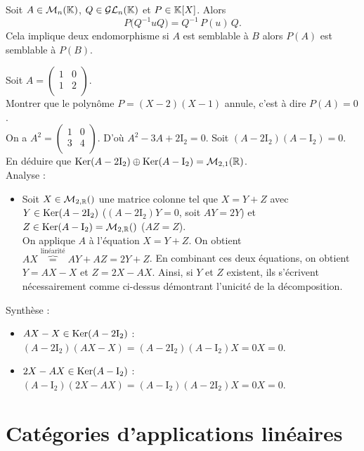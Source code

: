 \documentclass{book}
\begin{document}
\begin{Proposition}[Conjugaison]
Soit $A\in  \mathcal{M}_{n}(\mathbb{K})$, $Q\in  \mathcal{GL}_n(\mathbb{K})$ et $P\in  \mathbb{K} [X]$.
Alors
\[ P \bigl( Q^{-1}u Q \bigr) = Q^{-1} \, P(u) \, Q. \]
Cela implique deux endomorphisme si $A$ est semblable à $B$ alors $P(A)$ est semblable à $P(B)$.
\end{Proposition}
\begin{Exemple}
Soit $A=\begin{pmatrix}
1 &0 \\ 1&2\\
\end{pmatrix}$.\\
Montrer que le polynôme $P=(X-2)(X-1)$ annule, c'est à dire $P(A)=0$.\\
On a $A^2=\begin{pmatrix}
1 &0 \\ 3&4\\
\end{pmatrix}$. D'où $A^2-3A+2\mathrm{I}_2=0$. Soit  $(A-2\mathrm{I}_2)(A-\mathrm{I}_2)=0.$
En déduire que $\operatorname{Ker}(A-2\mathrm{I}_2)\oplus \operatorname{Ker}(A-\mathrm{I}_2)=\mathcal{M}_{2,1}(\mathbb{R})$.\\
Analyse :
\begin{itemize}
\item  Soit $X\in \M{2}{\R}$ une matrice colonne tel que $X=Y+Z$ avec  $Y\in \operatorname{Ker}(A-2\mathrm{I}_2)$ ($(A-2\mathrm{I}_2)Y=0$, soit $AY=2Y$) et  $Z\in\Ker(A-\mathrm{I}_2)=\M{2}{\R}$ ($AZ=Z$).\\
On applique $A$ à l'équation $X=Y+Z$. On obtient $AX\overbrace{=}^{\text{linéarité}}AY+AZ=2Y+Z$. En combinant ces deux équations, on obtient $Y=AX-X$ et $Z=2X-AX$. Ainsi, si $Y$ et $Z$ existent, ils s'écrivent nécessairement comme ci-dessus démontrant l'unicité de la décomposition.\\
\end{itemize}
Synthèse :
\begin{itemize}
\item $AX-X\in\operatorname{Ker}(A-2\mathrm{I}_2)$ :  $(A-2\mathrm{I}_2)(AX-X)=(A-2\mathrm{I}_2)(A-\mathrm{I}_2)X=0X=0.$
\item $2X-AX\in\operatorname{Ker}(A-\mathrm{I}_2)$ :  $(A-\mathrm{I}_2)(2X-AX)=(A-\mathrm{I}_2)(A-2\mathrm{I}_2)X=0X=0.$ 
\end{itemize}
\end{Exemple}





\section{Catégories d'applications linéaires}
\end{document}
